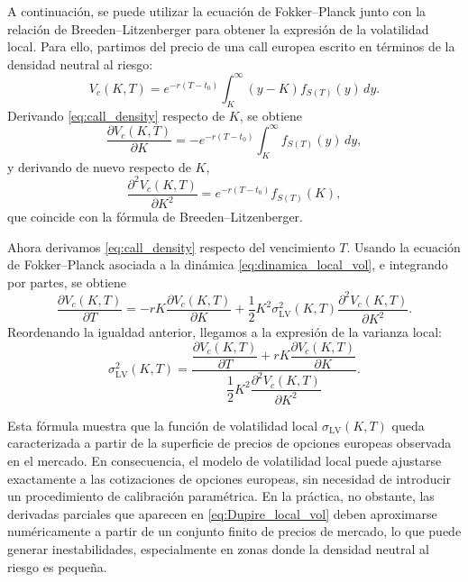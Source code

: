 A continuación, se puede utilizar la ecuación de Fokker--Planck junto con la relación de Breeden--Litzenberger para obtener la expresión de la volatilidad local. Para ello, partimos del precio de una call europea escrito en términos de la densidad neutral al riesgo:
\begin{equation}
V_c(K,T)
=
e^{-r(T-t_0)}
\int_K^{\infty} (y-K) f_{S(T)}(y)\,dy.
\label{eq:call_density}
\end{equation}
Derivando \ref{eq:call_density} respecto de $K$, se obtiene
\[
\frac{\partial V_c(K,T)}{\partial K}
=
-e^{-r(T-t_0)}
\int_K^{\infty} f_{S(T)}(y)\,dy,
\]
y derivando de nuevo respecto de $K$,
\[
\frac{\partial^2 V_c(K,T)}{\partial K^2}
=
e^{-r(T-t_0)}f_{S(T)}(K),
\]
que coincide con la fórmula de Breeden--Litzenberger.

Ahora derivamos \ref{eq:call_density} respecto del vencimiento \(T\). Usando la ecuación de Fokker--Planck asociada a la dinámica \ref{eq:dinamica_local_vol}, e integrando por partes, se obtiene
\begin{equation}
\frac{\partial V_c(K,T)}{\partial T}
=
-rK\frac{\partial V_c(K,T)}{\partial K}
+
\frac{1}{2}K^2\sigma_{\mathrm{LV}}^2(K,T)
\frac{\partial^2 V_c(K,T)}{\partial K^2}.
\label{eq:dupire_intermediate}
\end{equation}
Reordenando la igualdad anterior, llegamos a la expresión de la varianza local:
\begin{equation}
\label{eq:Dupire_local_vol}
\sigma_{\mathrm{LV}}^2(K,T)
=
\frac{
\dfrac{\partial V_c(K,T)}{\partial T}
+
rK\dfrac{\partial V_c(K,T)}{\partial K}
}{
\dfrac{1}{2}K^2
\dfrac{\partial^2 V_c(K,T)}{\partial K^2}
}.
\end{equation}

Esta fórmula muestra que la función de volatilidad local \(\sigma_{\mathrm{LV}}(K,T)\) queda caracterizada a partir de la superficie de precios de opciones europeas observada en el mercado. En consecuencia, el modelo de volatilidad local puede ajustarse exactamente a las cotizaciones de opciones europeas, sin necesidad de introducir un procedimiento de calibración paramétrica. En la práctica, no obstante, las derivadas parciales que aparecen en \ref{eq:Dupire_local_vol} deben aproximarse numéricamente a partir de un conjunto finito de precios de mercado, lo que puede generar inestabilidades, especialmente en zonas donde la densidad neutral al riesgo es pequeña. \medskip

